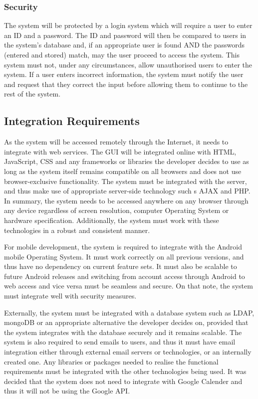 \documentclass[a4paper,12pt]{article}
\begin{document}
\subsubsection{Security}
The system will be protected by a login system which will require a user to enter an ID and a password. The ID and password will then be compared to users in the system's database and, if an appropriate user is found AND the passwords (entered and stored) match, may the user proceed to access the system. This system must not, under any circumstances, allow unauthorised users to enter the system. If a user enters incorrect information, the system must notify the user and request that they correct the input before allowing them to continue to the rest of the system.

\newpage
\subsection{Integration Requirements}

As the system will be accessed remotely through the Internet, it needs to integrate with web services. The GUI will be integrated online with HTML, JavaScript, CSS and any frameworks or libraries the developer decides to use as long as the system itself remains compatible on all browsers and does not use browser-exclusive functionality. The system must be integrated with the server, and thus make use of appropriate server-side technology such s AJAX and PHP. In summary, the system needs to be accessed anywhere on any browser through any device regardless of screen resolution, computer Operating System or hardware specification. Additionally, the system must work with these technologies in a robust and consistent manner. 

For mobile development, the system is required to integrate with the Android mobile Operating System. It must work correctly on all previous versions, and thus have no dependency on current feature sets. It must also be scalable to future Android releases and switching from account access through Android to web access and vice versa must be seamless and secure. On that note, the system must integrate well with security measures.

Externally, the system must be integrated with a database system such as LDAP, mongoDB or an appropriate alternative the developer decides on, provided that the system integrates with the database securely and it remains scalable. The system is also required to send emails to users, and thus it must have email integration either through external email servers or technologies, or an internally created one. Any libraries or packages needed to realise the functional requirements must be integrated with the other technologies being used. It was decided that the system does not need to integrate with Google Calender and thus it will not be using the Google API.
\end{document}
